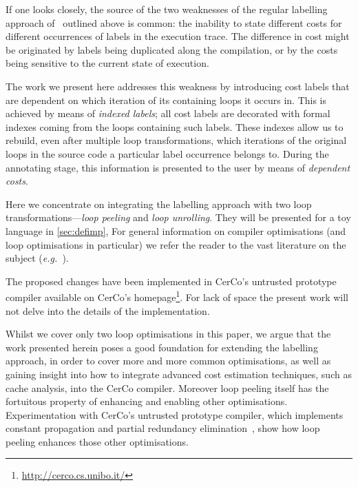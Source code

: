\documentclass[submission,copyright,creativecommons]{eptcs}
\theoremstyle{definition}
\newcommand{\eg}{\emph{e.g.\ }}
\begin{document}
If one looks closely, the source of the two weaknesses of the regular labelling approach of~\cite{labeling} outlined above is common: the inability to state different costs for different occurrences of labels in the execution trace. The difference in cost might be originated by labels being duplicated along the compilation, or by the costs being sensitive to the current state of execution.

The work we present here addresses this weakness by introducing cost labels that are dependent on which iteration of its containing loops it occurs in.
This is achieved by means of \emph{indexed labels}; all cost labels are decorated with formal indexes coming from the loops containing such labels.
These indexes allow us to rebuild, even after multiple loop transformations, which iterations of the original loops in the source code a particular label occurrence belongs to.
During the annotating stage, this information is presented to the user by means of \emph{dependent costs}.

Here we concentrate on integrating the labelling approach with two loop transformations---\emph{loop peeling} and \emph{loop unrolling}.
They will be presented for a toy language in \autoref{sec:defimp},
For general information on compiler optimisations (and loop optimisations in particular) we refer the reader to the vast literature on the subject (\eg\cite{muchnick,morgan}).

The proposed changes have been implemented in CerCo's untrusted prototype compiler
available on CerCo's homepage\footnote{\url{http://cerco.cs.unibo.it/}}. For
lack of space the present work will not delve into the details of the implementation.

Whilst we cover only two loop optimisations in this paper, we argue that the work presented herein poses a good foundation for extending the labelling approach, in order to cover more and more common optimisations, as well as gaining insight into how to integrate advanced cost estimation techniques, such as cache analysis, into the CerCo compiler.
Moreover loop peeling itself has the fortuitous property of enhancing and enabling other optimisations.
Experimentation with CerCo's untrusted prototype compiler, which implements constant propagation and partial redundancy elimination~\cite{PRE,muchnick}, show how loop peeling enhances those other optimisations.
\end{document}
